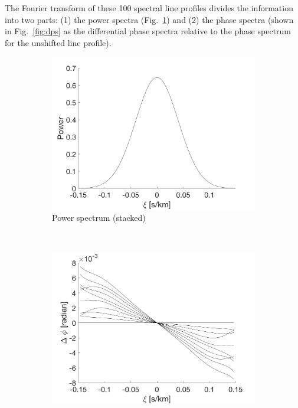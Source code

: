 The Fourier transform of these 100 spectral line profiles divides the information into two parts: 
(1) the power spectra (Fig.~\ref{fig:power_spectrum}) and (2) the phase spectra (shown in Fig.~\ref{fig:dps}
as the differential phase spectra relative to the phase spectrum for the unshifted line profile). 

\begin{figure}[tbp]	
    \begin{subfigure}[b]{0.49\textwidth}
        \includegraphics[width=\textwidth]{./Figures/Methods/2-FT_power.png}
        \caption{Power spectrum (stacked)}
        \label{fig:power_spectrum}
    \end{subfigure}
	~
    \begin{subfigure}[b]{0.49\textwidth}
        \includegraphics[width=\textwidth]{./Figures/Methods/4-Relative_phase_angle.png}

\end{subfigure}
\end{figure}
